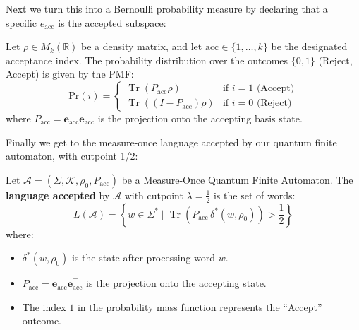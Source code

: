 Next we turn this into a Bernoulli probability measure by declaring that a specific $e_{\text{acc}}$ is the accepted subspace:

\begin{definition}\label{PVM_of_word_of_channel}
	\leanok
Let $\rho \in M_k(\mathbb{R})$ be a density matrix, and let $\text{acc} \in \{1, \dots, k\}$ be the designated acceptance index. The probability distribution over the outcomes $\{0, 1\}$ (Reject, Accept) is given by the PMF:
\begin{equation}
    \text{Pr}(i) = 
    \begin{cases} 
      \operatorname{Tr}(P_{\text{acc}} \rho) & \text{if } i = 1 \text{ (Accept)} \\
      \operatorname{Tr}((I - P_{\text{acc}}) \rho) & \text{if } i = 0 \text{ (Reject)}
    \end{cases}
\end{equation}
where $P_{\text{acc}} = \mathbf{e}_{\text{acc}} \mathbf{e}_{\text{acc}}^\top$ is the projection onto the accepting basis state.
\end{definition}

Finally we get to the measure-once language accepted by our quantum finite automaton, with cutpoint 1/2:

\begin{definition}\label{MOlanguageAcceptedBy}
	\leanok
Let $\mathcal{A} = (\Sigma, \mathcal{K}, \rho_0, P_{\text{acc}})$ be a Measure-Once Quantum Finite Automaton. The \textbf{language accepted} by $\mathcal{A}$ with cutpoint $\lambda = \frac{1}{2}$ is the set of words:
\begin{equation}
    L(\mathcal{A}) = \left\{ w \in \Sigma^* \mid \operatorname{Tr}(P_{\text{acc}} \, \delta^*(w, \rho_0)) > \frac{1}{2} \right\}
\end{equation}
where:
\begin{itemize}
    \item $\delta^*(w, \rho_0)$ is the state after processing word $w$. %
    \item $P_{\text{acc}} = \mathbf{e}_{\text{acc}} \mathbf{e}_{\text{acc}}^\top$ is the projection onto the accepting state.
    \item The index $1$ in the probability mass function represents the ``Accept'' outcome.
\end{itemize}
\end{definition}


